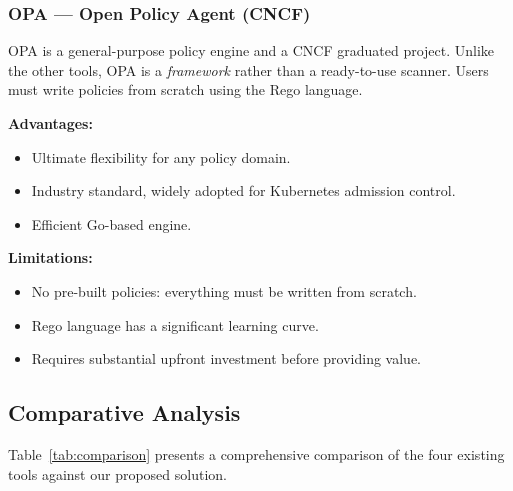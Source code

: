
\subsubsection{OPA — Open Policy Agent (CNCF)}

OPA is a general-purpose policy engine and a CNCF graduated project. Unlike the other tools, OPA is a \textit{framework} rather than a ready-to-use scanner. Users must write policies from scratch using the Rego language.

\textbf{Advantages:}
\begin{itemize}
    \item Ultimate flexibility for any policy domain.
    \item Industry standard, widely adopted for Kubernetes admission control.
    \item Efficient Go-based engine.
\end{itemize}

\textbf{Limitations:}
\begin{itemize}
    \item No pre-built policies: everything must be written from scratch.
    \item Rego language has a significant learning curve.
    \item Requires substantial upfront investment before providing value.
\end{itemize}


\subsection{Comparative Analysis}

Table~\ref{tab:comparison} presents a comprehensive comparison of the four existing tools against our proposed solution.

